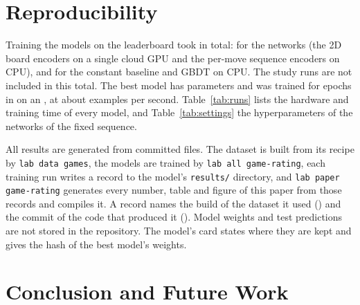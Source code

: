\documentclass[11pt]{article}
\begin{document}
\section{Reproducibility}
\label{sec:cost}

Training the  models on the leaderboard took 
in total:  for the networks (the 2D board encoders on
a single cloud GPU and the per-move sequence encoders on CPU), and
 for the constant baseline and GBDT on CPU. The study
runs are not included in this total. The best model has 
parameters and was trained for  epochs in 
on an , at about  examples per second.
Table~\ref{tab:runs} lists the hardware and training time of every model, and
Table~\ref{tab:settings} the hyperparameters of the networks of the fixed
sequence.

All results are generated from committed files. The dataset is built from
its recipe by \texttt{lab data games}, the models are trained by
\texttt{lab all game-rating}, each training run writes a record to the
model's \texttt{results/} directory, and \texttt{lab paper game-rating}
generates every number, table and figure of this paper from those records
and compiles it. A record names the build of the dataset it used
() and the commit of the code that produced it
(). Model weights and test predictions are not stored in the
repository. The model's card states where they are kept and gives the hash
of the best model's weights.

\section{Conclusion and Future Work}
\label{sec:conclusion}
\end{document}
